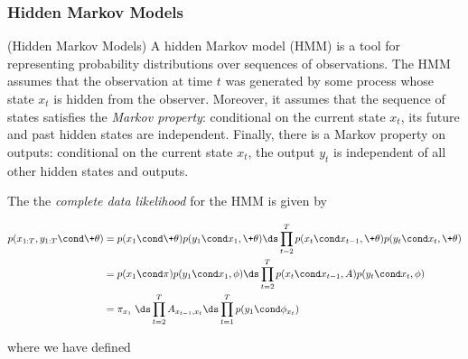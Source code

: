 \documentclass{article} %
\newcommand{\param}{\+\theta}
\newcommand{\state}{x}
\begin{document}
\subsubsection{Hidden Markov Models} 

\begin{example}{(Hidden Markov Models)} 
A  hidden Markov model (HMM) is a tool for representing probability distributions over sequences of observations.  The HMM assumes that the observation at time $t$ was generated by some process whose state $\state_t$ is hidden from the observer.  Moreover, it assumes that the sequence of states satisfies the \textit{Markov property}:  conditional on the current state $\state_t$, its future and past hidden states are independent.  Finally, there is a Markov property on outputs:  conditional on the current state $\state_t$, the output $y_t$ is independent of all other hidden states and outputs.

%
%
 
The the \textit{complete data likelihood} for the HMM is given by

\begin{align}
 p(\state_{1:T}, y_{1:T} \cond \param) &=  p(\state_1 \cond \param)  p(y_1 \cond \state_1, \param) \ds\prod_{t=2}^T p(\state_t \cond \state_{t-1}, \param) p(y_t \cond \state_t, \param) \nonumber \\
 &=  p(\state_1 \cond \pi) p(y_1 \cond \state_1, \phi) \ds\prod_{t=2}^T p(\state_t \cond \state_{t-1}, A) p(y_t \cond \state_t, \phi)   \nonumber \\
 &= \pi_{\state_1}  \; \ds\prod_{t=2}^T A_{\state_{t-1}, \state_t} \ds\prod_{t=1}^T p(y_1 \cond \phi_{\state_t}) \label{eqn:hmm_cdl_compact}
 \end{align}
 
where we have defined 


\end{example}
\end{document}
